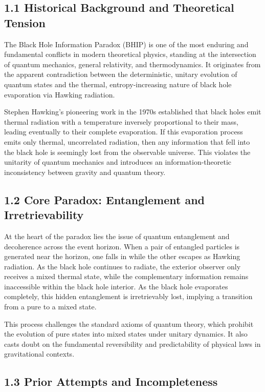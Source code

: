 \documentclass[11pt]{article}
\begin{document}
\subsection*{1.1 Historical Background and Theoretical Tension}

The Black Hole Information Paradox (BHIP) is one of the most enduring and fundamental conflicts in modern theoretical physics, standing at the intersection of quantum mechanics, general relativity, and thermodynamics. It originates from the apparent contradiction between the deterministic, unitary evolution of quantum states and the thermal, entropy-increasing nature of black hole evaporation via Hawking radiation.

Stephen Hawking's pioneering work in the 1970s established that black holes emit thermal radiation with a temperature inversely proportional to their mass, leading eventually to their complete evaporation. If this evaporation process emits only thermal, uncorrelated radiation, then any information that fell into the black hole is seemingly lost from the observable universe. This violates the unitarity of quantum mechanics and introduces an information-theoretic inconsistency between gravity and quantum theory.

\subsection*{1.2 Core Paradox: Entanglement and Irretrievability}

At the heart of the paradox lies the issue of quantum entanglement and decoherence across the event horizon. When a pair of entangled particles is generated near the horizon, one falls in while the other escapes as Hawking radiation. As the black hole continues to radiate, the exterior observer only receives a mixed thermal state, while the complementary information remains inaccessible within the black hole interior. As the black hole evaporates completely, this hidden entanglement is irretrievably lost, implying a transition from a pure to a mixed state.

This process challenges the standard axioms of quantum theory, which prohibit the evolution of pure states into mixed states under unitary dynamics. It also casts doubt on the fundamental reversibility and predictability of physical laws in gravitational contexts.

\subsection*{1.3 Prior Attempts and Incompleteness}
\end{document}
